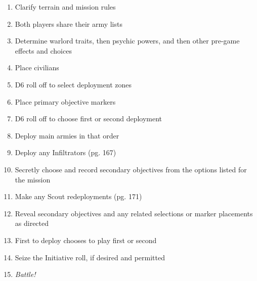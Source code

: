 \begin{enumerate}\shortlist
\item Clarify terrain and mission rules

\item Both players share their army lists

\item Determine warlord traits, then psychic powers, and then other
  pre-game effects and choices

\item Place civilians

\item D6 roll off to select deployment zones

\item Place primary objective markers

\item D6 roll off to choose first or second deployment

\item Deploy main armies in that order

\item Deploy any Infiltrators (pg. 167)

\item Secretly choose and record secondary objectives from the options
  listed for the mission

\item Make any Scout redeployments (pg. 171)

\item Reveal secondary objectives and any related selections or marker
  placements as directed

\item First to deploy chooses to play first or second

\item Seize the Initiative roll, if desired and permitted

\item \emph{Battle!}
\end{enumerate}
